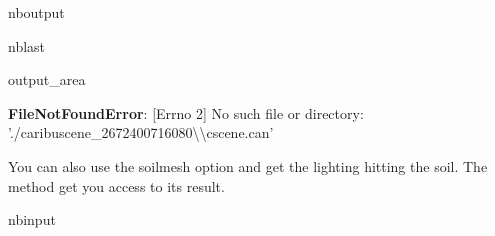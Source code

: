 \documentclass[letterpaper,10pt,english]{sphinxmanual}
\begin{document}
\begin{sphinxuseclass}{nboutput}
\begin{sphinxuseclass}{nblast}
{\begin{sphinxuseclass}{output_area}
\begin{sphinxuseclass}{}
\begin{sphinxVerbatim}[commandchars=\\\{\}]
\textcolor{ansi-red-intense}{\textbf{FileNotFoundError}}: [Errno 2] No such file or directory: './caribuscene\_2672400716080\textbackslash{}\textbackslash{}cscene.can'
\end{sphinxVerbatim}



\end{sphinxuseclass}
\end{sphinxuseclass}
}

\end{sphinxuseclass}
\end{sphinxuseclass}
\sphinxAtStartPar
You can also use the soilmesh option and get the lighting hitting the soil. The method  get you access to its result.

\begin{sphinxuseclass}{nbinput}
{
\begin{sphinxVerbatim}[commandchars=\\\{\}]
\llap{\color{nbsphinxin}[12]:\,\hspace{\fboxrule}\hspace{\fboxsep}}      

   
\PYG{p}{[}        \PYG{p}{]}

  
  
  
  

\end{sphinxVerbatim}
}

\end{sphinxuseclass}
\end{document}
